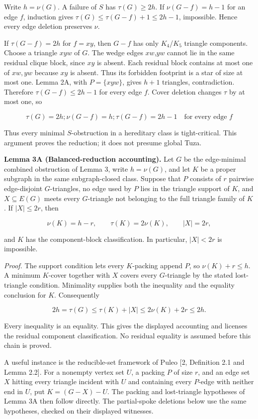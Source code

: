 \documentclass[11pt]{article}
\begin{document}
Write \(h=\nu(G)\). A failure of \(S\) has \(\tau(G)\ge 2h\). If
\(\nu(G-f)=h-1\) for an edge \(f\), induction gives
\(\tau(G)\le \tau(G-f)+1\le 2h-1\), impossible. Hence every edge
deletion preserves \(\nu\).

If \(\tau(G-f)=2h\) for \(f=xy\), then \(G-f\) has only \(K_4\)/\(K_5\)
triangle components. Choose a triangle \(xyw\) of \(G\). The wedge edges
\(xw\),\(yw\) cannot lie in the same residual clique block, since \(xy\)
is absent. Each residual block contains at most one of \(xw,yw\) because
\(xy\) is absent. Thus its forbidden footprint is a star of size at most
one. Lemma 2A, with \(P=\{xyw\}\), gives \(h+1\) triangles,
contradiction. Therefore \(\tau(G-f)\le 2h-1\) for every edge \(f\).
Cover deletion changes \(\tau\) by at most one, so

\[\tau(G)=2h; \nu(G-f)=h; \tau(G-f)=2h-1 \quad\text{for every edge }f\]

Thus every minimal \(S\)-obstruction in a hereditary class is
tight-critical. This argument proves the reduction; it does not presume
global Tuza.

\textbf{Lemma 3A (Balanced-reduction accounting).} Let \(G\) be the
edge-minimal combined obstruction of Lemma 3, write \(h=\nu(G)\), and
let \(K\) be a proper subgraph in the same subgraph-closed class.
Suppose that \(P\) consists of \(r\) pairwise edge-disjoint
\(G\)-triangles, no edge used by \(P\) lies in the triangle support of
\(K\), and \(X\subseteq E(G)\) meets every \(G\)-triangle not belonging
to the full triangle family of \(K\). If \(|X|\le2r\), then

\[\nu(K)=h-r,\qquad \tau(K)=2\nu(K),\qquad |X|=2r,\]

and \(K\) has the component-block classification. In particular,
\(|X|<2r\) is impossible.

\emph{Proof.} The support condition lets every \(K\)-packing append
\(P\), so \(\nu(K)+r\le h\). A minimum \(K\)-cover together with \(X\)
covers every \(G\)-triangle by the stated lost-triangle condition.
Minimality supplies both the inequality and the equality conclusion for
\(K\). Consequently

\[2h=\tau(G)\le\tau(K)+|X|\le2\nu(K)+2r\le2h.\]

Every inequality is an equality. This gives the displayed accounting and
licenses the residual component classification. No residual equality is
assumed before this chain is proved.

A useful instance is the reducible-set framework of Puleo {[}2,
Definition 2.1 and Lemma 2.2{]}. For a nonempty vertex set \(U\), a
packing \(P\) of size \(r\), and an edge set \(X\) hitting every
triangle incident with \(U\) and containing every \(P\)-edge with
neither end in \(U\), put \(K=(G-X)-U\). The packing and lost-triangle
hypotheses of Lemma 3A then follow directly. The partial-spoke deletions
below use the same hypotheses, checked on their displayed witnesses.
\end{document}
